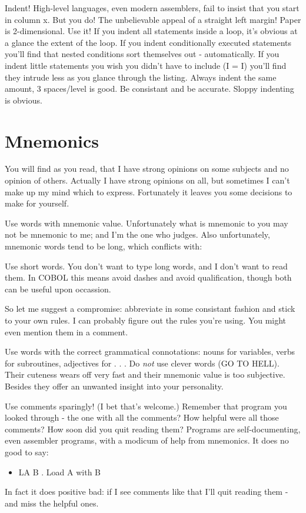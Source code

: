 \documentclass[b5paper, oneside]{book}
\begin{document}
Indent! High-level languages, even modern assemblers, fail to insist that you start in column x. But you do! The unbelievable appeal of a straight left margin! Paper is 2-dimensional. Use it! If you indent all statements inside a loop, it's obvious at a glance the extent of the loop. If you indent conditionally executed statements you'll find that nested conditions sort themselves out - automatically. If you indent little statements you wish you didn't have to include (I = I) you'll find they intrude less as you glance through the listing. Always indent the same amount, 3 spaces/level is good. Be consistant and be accurate. Sloppy indenting is obvious.

\section{Mnemonics}
You will find as you read, that I have strong opinions on some subjects and no opinion of others. Actually I have strong opinions on all, but sometimes I can't make up my mind which to express. Fortunately it leaves you some decisions to make for yourself.

Use words with mnemonic value. Unfortunately what is mnemonic to you may not be mnemonic to me; and I'm the one who judges. Also unfortunately, mnemonic words tend to be long, which conflicts with:

Use short words. You don't want to type long words, and I don't want to read them. In COBOL this means avoid dashes and avoid qualification, though both can be useful upon occassion.

So let me suggest a compromise: abbreviate in some consistant fashion and stick to your own rules. I can probably figure out the rules you're using. You might even mention them in a comment.

Use words with the correct grammatical connotations: nouns for variables, verbs for subroutines, adjectives for . . . Do {\em not} use clever words (GO TO HELL). Their cuteness wears off very fast and their mnemonic value is too subjective. Besides they offer an unwanted insight into your personality.

Use comments sparingly! (I bet that's welcome.) Remember that program you looked through - the one with all the comments? How helpful were all those comments? How soon did you quit reading them? Programs are self-documenting, even assembler programs, with a modicum of help from mnemonics. It does no good to say:\begin{itemize}
   \item LA B . Load A with B\end{itemize}
In fact it does positive bad: if I see comments like that I'll quit reading them - and miss the helpful ones.
\end{document}

